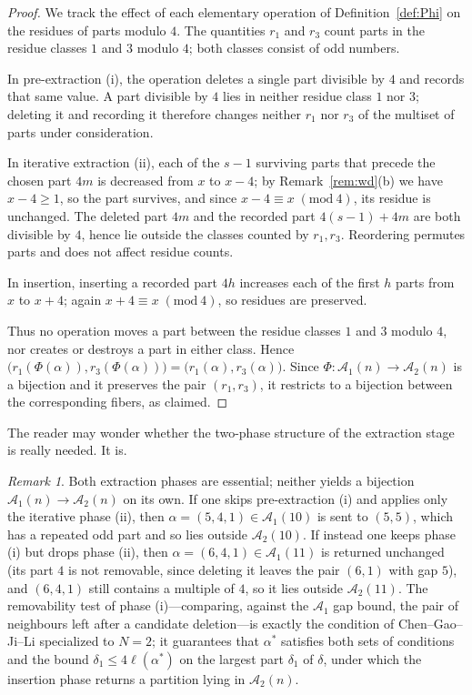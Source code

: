 \documentclass[11pt]{amsart}
\theoremstyle{definition}
\theoremstyle{remark}
\newtheorem{remark}[theorem]{Remark}
\newcommand{\Aone}{\mathcal A_1}
\newcommand{\Atwo}{\mathcal A_2}
\newcommand{\length}{\ell}
\newcommand{\modulo}[1]{\;(\mathrm{mod}\ #1)}
\begin{document}
\begin{proof}
We track the effect of each elementary operation of Definition~\ref{def:Phi} on
the residues of parts modulo \(4\). The quantities \(r_1\) and \(r_3\) count parts
in the residue classes \(1\) and \(3\) modulo \(4\); both classes consist of odd
numbers.

In pre-extraction (i), the operation deletes a single part divisible by \(4\) and
records that same value. A part divisible by \(4\) lies in neither residue class
\(1\) nor \(3\); deleting it and recording it therefore changes neither \(r_1\) nor
\(r_3\) of the multiset of parts under consideration.

In iterative extraction (ii), each of the \(s-1\) surviving parts that precede the
chosen part \(4m\) is decreased from \(x\) to \(x-4\); by Remark~\ref{rem:wd}(b) we have \(x-4\ge 1\), so the part survives, and since \(x-4\equiv x\modulo 4\),
its residue is unchanged. The deleted part \(4m\) and the
recorded part \(4(s-1)+4m\) are both divisible by \(4\), hence lie outside the
classes counted by \(r_1,r_3\). Reordering permutes parts and does not affect
residue counts.

In insertion, inserting a recorded part \(4h\) increases each of the first \(h\)
parts from \(x\) to \(x+4\); again \(x+4\equiv x\modulo 4\), so residues are
preserved.

Thus no operation moves a part between the residue classes \(1\) and \(3\) modulo
\(4\), nor creates or destroys a part in either class. Hence
\(\bigl(r_1(\Phi(\alpha)),r_3(\Phi(\alpha))\bigr)=\bigl(r_1(\alpha),r_3(\alpha)\bigr)\).
Since \(\Phi:\Aone(n)\to\Atwo(n)\) is a bijection \cite[Section 3]{CGJL} and it
preserves the pair \((r_1,r_3)\), it restricts to a bijection between the
corresponding fibers, as claimed.
\end{proof}

The reader may wonder whether the two-phase structure of the extraction stage is really needed. It is.

\begin{remark}\label{rem:phases}
Both extraction phases are essential; neither yields a bijection $\Aone(n)\to\Atwo(n)$ on its own. If one skips pre-extraction (i) and applies only the iterative phase (ii), then \(\alpha=(5,4,1)\in\Aone(10)\) is sent to \((5,5)\), which has a repeated odd part and so lies outside \(\Atwo(10)\). If instead one keeps phase (i) but drops phase (ii), then \(\alpha=(6,4,1)\in\Aone(11)\) is returned unchanged (its part $4$ is not removable, since deleting it leaves the pair $(6,1)$ with gap $5$), and $(6,4,1)$ still contains a multiple of \(4\), so it lies outside \(\Atwo(11)\). The removability test of phase (i)---comparing, against the \(\Aone\) gap bound, the pair of neighbours left after a candidate deletion---is exactly the condition of Chen--Gao--Ji--Li \cite[Section 3, Step 1]{CGJL} specialized to \(N=2\); it guarantees that $\alpha^\ast$ satisfies both sets of conditions and the bound \(\delta_1\le 4\length(\alpha^\ast)\) on the largest part $\delta_1$ of $\delta$, under which the insertion phase returns a partition lying in \(\Atwo(n)\).
\end{remark}
\end{document}

